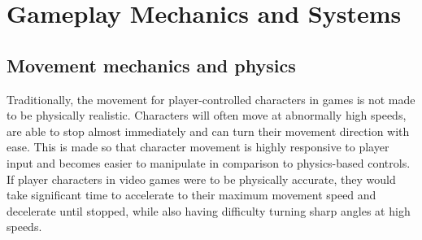 \section{Gameplay Mechanics and Systems}



\subsection{Movement mechanics and physics}


Traditionally, the movement for player-controlled characters in games is not made to be physically realistic. Characters will often move at abnormally high speeds, are able to stop almost immediately and can turn their movement direction with ease. This is made so that character movement is highly responsive to player input and becomes easier to manipulate in comparison to physics-based controls. If player characters in video games were to be physically accurate, they would take significant time to accelerate to their maximum movement speed and decelerate until stopped, while also having difficulty turning sharp angles at high speeds.

